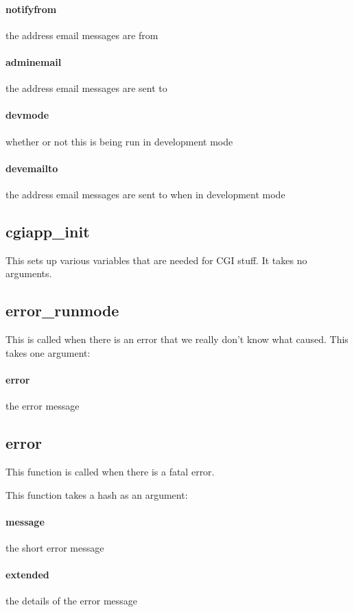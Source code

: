 \documentclass[12pt,titlepage]{article}
\begin{document}
\paragraph{notifyfrom}
the address email messages are from 

\paragraph{adminemail}
the address email messages are sent to 

\paragraph{devmode}
whether or not this is being run in development mode 

\paragraph{devemailto}
the address email messages are sent to when in development mode 

\subsection{cgiapp\_init}
This sets up various variables that are needed for CGI stuff. It takes no arguments.

\subsection{error\_runmode}
This is called when there is an error that we really don't know what caused. This takes one argument:

\paragraph{error}
the error message

\subsection{error}
This function is called when there is a fatal error.

This function takes a hash as an argument:
\paragraph{message}
the short error message 

\paragraph{extended}
the details of the error message
\end{document}

